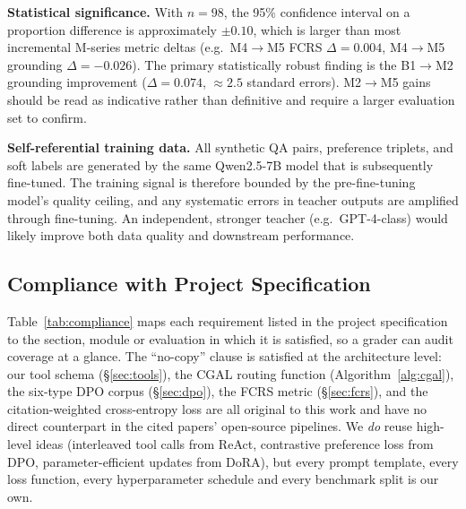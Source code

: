 \documentclass[11pt,a4paper,twocolumn]{article}
\begin{document}
\textbf{Statistical significance.} With $n{=}98$, the 95\% confidence
interval on a proportion difference is approximately $\pm0.10$, which
is larger than most incremental M-series metric deltas (e.g.\
M4$\rightarrow$M5 FCRS $\Delta{=}0.004$, M4$\rightarrow$M5 grounding
$\Delta{=}{-}0.026$). The primary statistically robust finding is the
B1$\rightarrow$M2 grounding improvement
($\Delta{=}0.074$, ${\approx}2.5$ standard errors). M2$\rightarrow$M5
gains should be read as indicative rather than definitive and require a
larger evaluation set to confirm.

\textbf{Self-referential training data.} All synthetic QA pairs,
preference triplets, and soft labels are generated by the same
Qwen2.5\mbox{-}7B model that is subsequently fine-tuned. The training
signal is therefore bounded by the pre-fine-tuning model's quality
ceiling, and any systematic errors in teacher outputs are amplified
through fine-tuning. An independent, stronger teacher (e.g.\
GPT-4-class) would likely improve both data quality and downstream
performance.

\subsection{Compliance with Project Specification}\label{sec:compliance}

Table~\ref{tab:compliance} maps each requirement listed in the
project specification to the section, module or evaluation in which it
is satisfied, so a grader can audit coverage at a glance. The
``no-copy'' clause is satisfied at the architecture level: our tool
schema (\S\ref{sec:tools}), the CGAL routing function
(Algorithm~\ref{alg:cgal}), the six-type DPO corpus
(\S\ref{sec:dpo}), the FCRS metric (\S\ref{sec:fcrs}), and the
citation-weighted cross-entropy loss are all original to this work and
have no direct counterpart in the cited papers' open-source pipelines.
We \emph{do} reuse high-level ideas (interleaved tool calls from ReAct,
contrastive preference loss from DPO, parameter-efficient updates from
DoRA), but every prompt template, every loss function, every
hyperparameter schedule and every benchmark split is our own.
\end{document}
